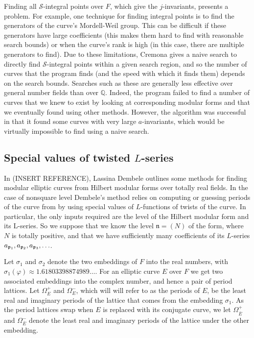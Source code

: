 \documentclass{amsart}
\newcommand{\n}{\mathfrak{n}}
\newcommand{\ap}[1]{a_{\p_{#1}}}
\newcommand{\Ebar}{\overline{E}}
\begin{document}
Finding all $\mathcal{S}$-integral points over $F$, which give the
$j$-invariants, presents a problem. For example, one technique for finding
integral points is to find the generators of the curve's Mordell-Weil group.
This can be difficult if these generators have large coefficients (this makes
them hard to find with reasonable search bounds) or when the curve's rank
is high (in this case, there are multiple generators to find). Due to these
limitations, Cremona gives a naive search to directly find
$\mathcal{S}$-integral points within a given search region, and so the number
of curves that the program finds (and the speed with which it finds them)
depends on the search bounds. Searches such as these are generally less
effective over general number fields than over $\mathbb{Q}$. Indeed, the
program failed to find a number of curves that we knew to exist by looking
at corresponding modular forms and that we eventually found using other
methods. However, the algorithm was successful in that it found some curves
with very large $a$-invariants, which would be virtually impossible to find
using a naive search.

\subsection{Special values of twisted $L$-series}\label{sec:specialvalues}
\newcommand{\Omegap}{\Omega^+}
\newcommand{\Omegam}{\Omega^-}
\newcommand{\Omegapp}{\Omega^{++}}
\newcommand{\Omegapm}{\Omega^{+-}}
\newcommand{\Omegamp}{\Omega^{-+}}
\newcommand{\Omegamm}{\Omega^{--}}
\newcommand{\OmegammEguess}{\Omega^{--}_{E, \mathrm{guess}}}
\newcommand{\OmegampEguess}{\Omega^{-+}_{E, \mathrm{guess}}}
\newcommand{\OmegapmEguess}{\Omega^{+-}_{E, \mathrm{guess}}}
\newcommand{\OmegappEguess}{\Omega^{++}_{E, \mathrm{guess}}}

In (INSERT REFERENCE), Lassina Dembele outlines some methods for finding
modular elliptic curves from Hilbert modular forms over totally real
fields. In the case of nonsquare level Dembele's method relies on computing
or guessing periods of the curve from by using special values of
$L$-functions of twists of the curve. In particular, the only inputs
required are the level of the Hilbert modular form and its L-series. So
we suppose that we know the level $\n = (N)$ of the form, where $N$ is
totally positive, and that we have sufficiently many coefficients of its
$L$-series $\ap{1}, \ap{2}, \ap{3}, \ldots$.

Let $\sigma_1$ and $\sigma_2$ denote the two embeddings of $F$ into the
real numbers, with $\sigma_1(\varphi) \approx 1.61803398874989\ldots$. For
an elliptic curve $E$ over $F$ we get two associated embeddings into
the complex number, and hence a pair of period lattices. Let $\Omegap_E$
and $\Omegam_E$, which will will refer to as the periods of $E$,
be the least real and imaginary periods of the lattice
that comes from the embedding $\sigma_1$. As the period lattices swap
when $E$ is replaced with its conjugate curve, we let $\Omegap_{\Ebar}$
and $\Omegam_{\Ebar}$ denote the least real and imaginary periods
of the lattice under the other embedding.
\end{document}
